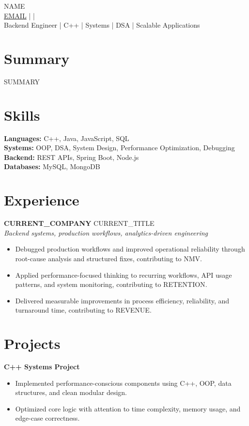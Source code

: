 \documentclass[10pt]{article}
\begin{document}
\begin{center}
{\Large {{NAME}}}\\
\href{mailto:{{EMAIL}}}{{{EMAIL}}} \quad |  \quad | \\
Backend Engineer | C++ | Systems | DSA | Scalable Applications
\end{center}

\section*{Summary}
{{SUMMARY}}

\section*{Skills}
\textbf{Languages:} C++, Java, JavaScript, SQL\\
\textbf{Systems:} OOP, DSA, System Design, Performance Optimization, Debugging\\
\textbf{Backend:} REST APIs, Spring Boot, Node.js\\
\textbf{Databases:} MySQL, MongoDB

\section*{Experience}
\textbf{{{CURRENT_COMPANY}}} \hfill {{CURRENT_TITLE}}\\
\textit{Backend systems, production workflows, analytics-driven engineering}\\
\begin{itemize}
\item Debugged production workflows and improved operational reliability through root-cause analysis and structured fixes, contributing to {{NMV}}.
\item Applied performance-focused thinking to recurring workflows, API usage patterns, and system monitoring, contributing to {{RETENTION}}.
\item Delivered measurable improvements in process efficiency, reliability, and turnaround time, contributing to {{REVENUE}}.
\end{itemize}

\section*{Projects}
\textbf{C++ Systems Project}\\
\begin{itemize}
\item Implemented performance-conscious components using C++, OOP, data structures, and clean modular design.
\item Optimized core logic with attention to time complexity, memory usage, and edge-case correctness.
\end{itemize}
\end{document}
